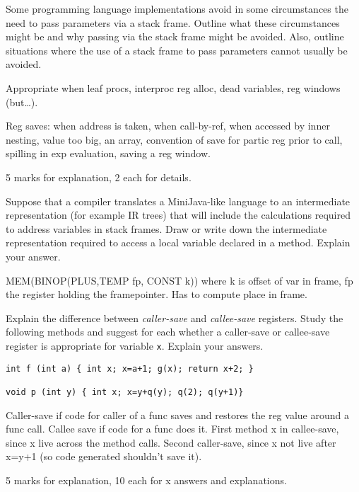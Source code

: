 \documentclass[11pt]{bareexam}
\begin{document}
\begin{questions}
\begin{subquestions}
\subquestion
Some programming language implementations avoid in some circumstances the
need to pass parameters via a stack frame. Outline what these circumstances
might be and why passing via the stack frame might be avoided.
Also, outline situations where the use of a 
stack frame to pass parameters cannot usually be avoided.

\begin{modelanswer}
Appropriate when leaf procs, interproc
reg alloc, dead variables, reg windows (but\ldots).

Reg saves: when address is taken,
when call-by-ref,
when accessed by inner nesting,
value too big,
an array,
convention of save for partic reg prior to call,
spilling in exp evaluation,
saving a reg window.

5 marks for explanation, 2 each for details.
\end{modelanswer}

\subquestion
Suppose  that a compiler translates a MiniJava-like language
to an intermediate representation (for example IR trees) 
that will include 
the calculations required to address variables in stack frames.
Draw or write down
the intermediate representation
required to access a local variable declared in a method.
Explain your answer.

\begin{modelanswer}
MEM(BINOP(PLUS,TEMP fp, CONST k)) where k is offset of var in frame, fp the
register holding the framepointer. Has to compute place in frame.
\end{modelanswer}

\subquestion
Explain the difference between \emph{caller-save\/} and \emph{callee-save\/}
registers. Study the following methods and suggest for each whether a caller-save 
or callee-save register is appropriate for variable \verb+x+. Explain your answers.
\begin{verbatim}
int f (int a) { int x; x=a+1; g(x); return x+2; }

void p (int y) { int x; x=y+q(y); q(2); q(y+1)}
\end{verbatim}

\begin{modelanswer}
Caller-save if code for caller of a func saves and restores the reg value
around a func call. Callee save if code for a func does it. First method x in
callee-save, since x live across the method calls. Second caller-save, since
x not live after x=y+1 (so code generated shouldn't save it).

5 marks for explanation, 10 each for x answers and explanations.
\end{modelanswer}

\end{subquestions}

\end{questions}
\end{document}
